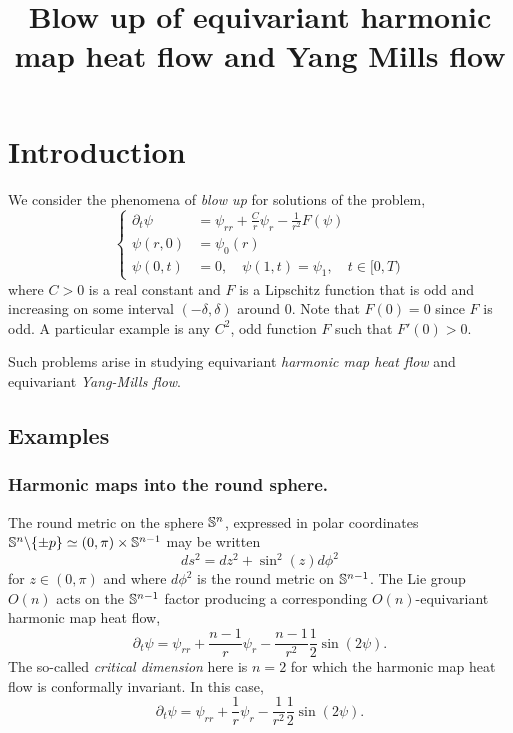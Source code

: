 \documentclass{amsart}
\begin{document}
\title[]
 {Blow up of equivariant harmonic map heat flow and Yang Mills flow}

\curraddr{}
\email{}

\dedicatory{}
\subjclass[2010]{}
\keywords{}

\begin{abstract}
\end{abstract}

\maketitle

\section{Introduction}
\label{sec:intro}

We consider the phenomena of \emph{blow up} for solutions of the problem,
\begin{equation}
\label{eq:pde}
\begin{cases}
\partial_t \psi &= \psi_{rr} + \frac{C}{r} \psi_r - \frac{1}{r^2} F(\psi) \\
\psi(r, 0) &= \psi_0(r) \\
\psi(0, t) &= 0, \quad \psi(1, t) = \psi_1, \quad t \in [0, T)
\end{cases}
\end{equation}
where \(C > 0\) is a real constant and \(F\) is a Lipschitz function that is odd and increasing on some interval \((-\delta, \delta)\) around \(0\). Note that \(F(0) = 0\) since \(F\) is odd. A particular example is any \(C^2\), odd function \(F\) such that \(F'(0) > 0\).

Such problems arise in studying equivariant \emph{harmonic map heat flow} and equivariant \emph{Yang-Mills flow}.

\subsection*{Examples}

\subsubsection*{Harmonic maps into the round sphere.}

The round metric on the sphere \(\S^n\), expressed in polar coordinates \(\S^n \backslash \{\pm p\} \simeq (0, \pi) \times \S^{n-1}\) may be written
\[
ds^2 = dz^2 + \sin^2(z) d\phi^2
\]
for \(z \in (0, \pi)\) and where \(d\phi^2\) is the round metric on \(\S^{n-1}\). The Lie group \(O(n)\) acts on the \(\S^{n-1}\) factor producing a corresponding \(O(n)\)-equivariant harmonic map heat flow,
\[
\partial_t \psi = \psi_{rr} + \frac{n-1}{r} \psi_r - \frac{n-1}{r^2} \frac{1}{2} \sin (2\psi).
\]
The so-called \emph{critical dimension} here is \(n=2\) for which the harmonic map heat flow is conformally invariant. In this case,
\[
\partial_t \psi = \psi_{rr} + \frac{1}{r} \psi_r - \frac{1}{r^2} \frac{1}{2} \sin (2\psi).
\]
\end{document}
